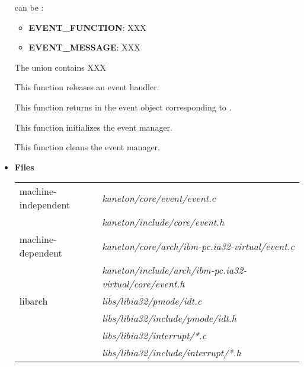 \begin{itemize}
{	    can be :
	   \begin{itemize}
	     \item
	       \textbf{EVENT\_FUNCTION}: XXX
	     \item
	       \textbf{EVENT\_MESSAGE}: XXX
	   \end{itemize}

	   The union  contains XXX
	 }

	 {
	   This function releases an event handler.
	 }

	 {
	   This function returns in  the event object
	   corresponding to .
	 }

	 {
	   This function initializes the event manager.
	 }

	 {
	   This function cleans the event manager.
	 }
  \item {\bf {Files}}\\

    \begin{tabular}{| l | l |}
      \hline
      machine-independent & {\em kaneton/core/event/event.c}\\
      &  {\em kaneton/include/core/event.h}\\\hline
      machine-dependent & {\em kaneton/core/arch/ibm-pc.ia32-virtual/event.c}\\
      & {\em kaneton/include/arch/ibm-pc.ia32-virtual/core/event.h}\\\hline
      libarch & {\em libs/libia32/pmode/idt.c}\\
      & {\em libs/libia32/include/pmode/idt.h}\\
      & {\em libs/libia32/interrupt/*.c}\\
      & {\em libs/libia32/include/interrupt/*.h}\\\hline
    \end{tabular}
\end{itemize}


%
%

\newpage

